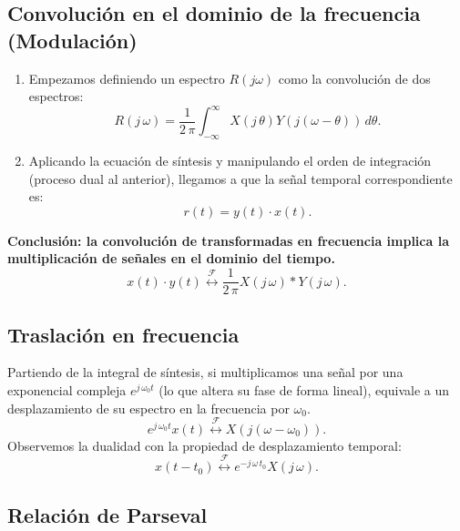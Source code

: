 \subsection{Convolución en el dominio de la frecuencia (Modulación)}

\begin{enumerate}
	\item Empezamos definiendo un espectro $R(j\omega)$ como la convolución de dos espectros:
	\begin{equation}
		R(j \, \omega) = \frac{1}{2 \, \pi} \int_{-\infty}^{\infty} X(j \, \theta) Y(j(\omega - \theta)) \, d\theta .
	\end{equation}
	\item Aplicando la ecuación de síntesis y manipulando el orden de integración (proceso dual al anterior), llegamos a que la señal temporal correspondiente es:
	\begin{equation}
		r(t) = y(t) \cdot x(t) .
	\end{equation}
\end{enumerate}

\textbf{Conclusión: la convolución de transformadas en frecuencia implica la multiplicación de señales en el dominio del tiempo.}
\begin{equation}
	x(t) \cdot y(t) \stackrel{\mathcal{F}}{\longleftrightarrow} \frac{1}{2 \, \pi} X(j \, \omega) * Y(j \, \omega).
\end{equation}

\subsection{Traslación en frecuencia}

Partiendo de la integral de síntesis, si multiplicamos una señal por una exponencial compleja $e^{j \, \omega_{0} t}$ (lo que altera su fase de forma lineal), equivale a un desplazamiento de su espectro en la frecuencia por $\omega_0$.
\begin{equation}
	e^{j \, \omega_{0} t} x(t) \stackrel{\mathcal{F}}{\longleftrightarrow} X(j(\omega - \omega_{0})) .
\end{equation}
Observemos la dualidad con la propiedad de desplazamiento temporal:
\begin{equation}
	x(t - t_{0}) \stackrel{\mathcal{F}}{\longleftrightarrow} e^{-j \, \omega \, t_{0}} X(j \, \omega) .
\end{equation}

\subsection{Relación de Parseval}

